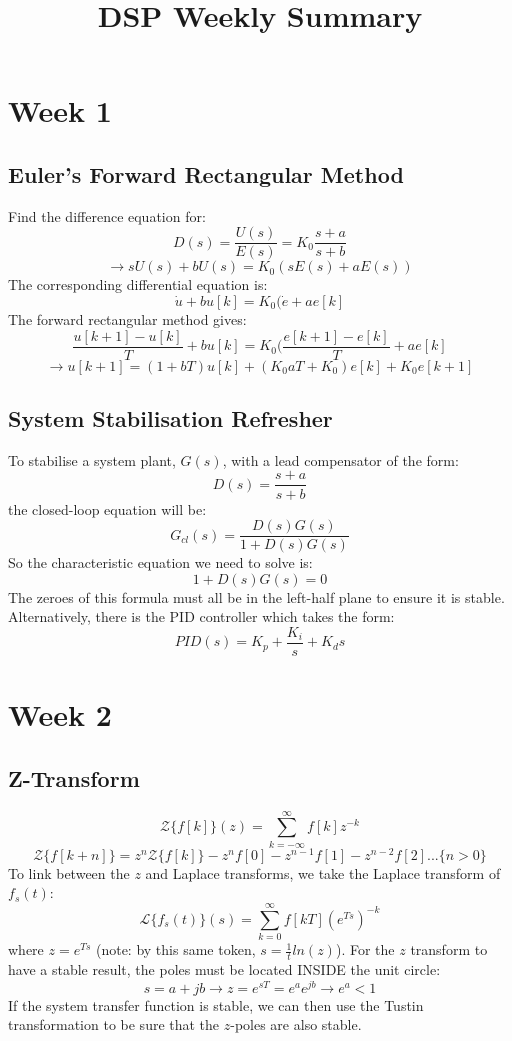 \documentclass[journal]{IEEEtran}
\begin{document}
\title{DSP Weekly Summary}
{}
\maketitle

\section{\textbf{Week 1}}
\subsection{\textbf{Euler's Forward Rectangular Method}}
Find the difference equation for:
\[
    D(s) = \frac{U(s)}{E(s)} = K_0 \frac{s + a}{s + b}
\]
\[
    \rightarrow sU(s) + bU(s) = K_0 (sE(s) + aE(s)) 
\]
The corresponding differential equation is:
\[
    \dot{u} + bu[k] = K_0(\dot{e} + ae[k]
\]
The forward rectangular method gives:
\[
    \frac{u[k + 1] - u[k]}{T} + bu[k] = K_0(\frac{e[k + 1] - e[k]}{T} + ae[k]
\]
\[
    \rightarrow u[k + 1] = (1 + bT)u[k] + (K_0aT + K_0)e[k] + K_0 e[k + 1]
\]
\subsection{\textbf{System Stabilisation Refresher}}
To stabilise a system plant, $G(s)$, with a lead compensator of the form:
\[
    D(s) = \frac{s + a}{s + b}
\]
the closed-loop equation will be:
\[
    G_{cl}(s) = \frac{D(s)G(s)}{1 + D(s)G(s)}
\]
So the characteristic equation we need to solve is:
\[
    1 + D(s)G(s) = 0
\]
The zeroes of this formula must all be in the left-half plane to ensure it is stable. Alternatively, there is the PID controller which takes the form:
\[
    PID(s) = K_p + \frac{K_i}{s} + K_ds
\]
\section{\textbf{Week 2}}
\subsection{\textbf{Z-Transform}}
\[
    \mathcal{Z}\{f[k]\}(z) = \sum_{k = -\infty}^{\infty} f[k]z^{-k}
\]
\[
    \mathcal{Z}\{f[k + n]\} = z^n\mathcal{Z}\{f[k]\} - z^nf[0] - z^{n -1}f[1] - z^{n - 2}f[2] ... \{n > 0\}
\]
To link between the $z$ and Laplace transforms, we take the Laplace transform of $f_s(t)$:
\[
    \mathcal{L}\{f_s(t)\}(s) = \sum_{k = 0}^{\infty} f[kT](e^{Ts})^{-k}
\]
where $z = e^{Ts}$ (note: by this same token, $s = \frac{1}{t}ln(z)$). For the $z$ transform to have a stable result, the poles must be located INSIDE the unit circle:
\[
	s = a + jb \rightarrow z = e^{sT} = e^ae^{jb} \rightarrow e^a < 1
\]
If the system transfer function is stable, we can then use the Tustin transformation to be sure that the $z$-poles are also stable.
\end{document}
